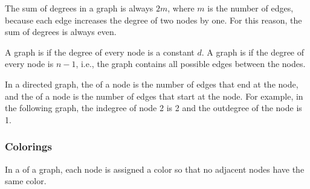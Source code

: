 The sum of degrees in a graph is always $2m$,
where $m$ is the number of edges,
because each edge
increases the degree of two nodes by one.
For this reason, the sum of degrees is always even.


A graph is  if the
degree of every node is a constant $d$.
A graph is  if the
degree of every node is $n-1$, i.e.,
the graph contains all possible edges
between the nodes.


In a directed graph, the 
of a node is the number of edges
that end at the node,
and the  of a node
is the number of edges that start at the node.
For example, in the following graph,
the indegree of node 2 is 2
and the outdegree of the node is 1.

\begin{center}
\end{center}

\subsubsection{Colorings}


In a  of a graph,
each node is assigned a color so that
no adjacent nodes have the same color.

